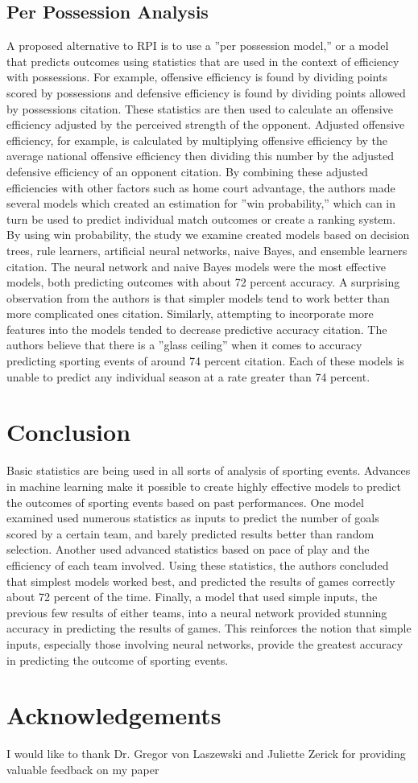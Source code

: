 \documentclass[sigconf]{acmart}
\begin{document}
\subsection{Per Possession Analysis}
A proposed alternative to RPI is to use a ''per possession model,'' or a model that predicts outcomes using statistics that are used in the context of efficiency with possessions. For example, offensive efficiency is found by dividing points scored by possessions and defensive efficiency is found by dividing points allowed by possessions citation\cite{MachineLearning}. These statistics are then used to calculate an offensive efficiency adjusted by the perceived strength of the opponent. Adjusted offensive efficiency, for example, is calculated by multiplying offensive efficiency by the average national offensive efficiency then dividing this number by the adjusted defensive efficiency of an opponent citation. By combining these adjusted efficiencies with other factors such as home court advantage, the authors made several models which created an estimation for ''win probability,'' which can in turn be used to predict individual match outcomes or create a ranking system. By using win probability, the study we examine created models based on decision trees, rule learners, artificial neural networks, naive Bayes, and ensemble learners citation. The neural network and naive Bayes models were the most effective models, both predicting outcomes with about 72 percent accuracy. A surprising observation from the authors is that simpler models tend to work better than more complicated ones citation. Similarly, attempting to incorporate more features into the models tended to decrease predictive accuracy citation. The authors believe that there is a ''glass ceiling'' when it comes to accuracy predicting sporting events of around 74 percent citation. Each of these models is unable to predict any individual season at a rate greater than 74 percent.\cite{MachineLearning}

\section{Conclusion}
Basic statistics are being used in all sorts of analysis of sporting events. Advances in machine learning make it possible to create highly effective models to predict the outcomes of sporting events based on past performances. One model examined used numerous statistics as inputs to predict the number of goals scored by a certain team, and barely predicted results better than random selection. Another used advanced statistics based on pace of play and the efficiency of each team involved. Using these statistics, the authors concluded that simplest models worked best, and predicted the results of games correctly about 72 percent of the time. Finally, a model that used simple inputs, the previous few results of either teams, into a neural network provided stunning accuracy in predicting the results of games. This reinforces the notion that simple inputs, especially those involving neural networks, provide the greatest accuracy in predicting the outcome of sporting events.

\section{Acknowledgements}
I would like to thank Dr. Gregor von Laszewski and Juliette Zerick for providing valuable feedback on my paper



\end{document}
